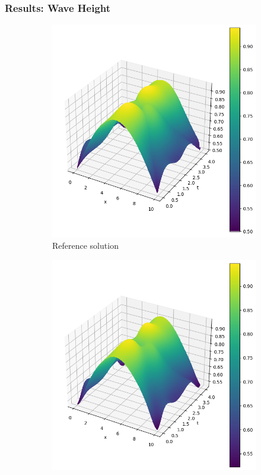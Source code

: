 \begin{frame}
    \frametitle{Results: Wave Height}

    \begin{figure}
        \centering
        \begin{subfigure}[b]{0.45\textwidth}
            \centering
            \includegraphics[width=\textwidth]{images/inhomogeneous_swe_pseudospectral_height.png}
            \caption{Reference solution}
            \label{fig:15_inhomogeneous_pseudospectral_swe_height}
        \end{subfigure}
        \hfill
        \begin{subfigure}[b]{0.45\textwidth}
            \centering
            \includegraphics[width=\textwidth]{images/inhomogeneous_swe_pinn_height.png}

\end{subfigure}
\end{figure}
\end{frame}
